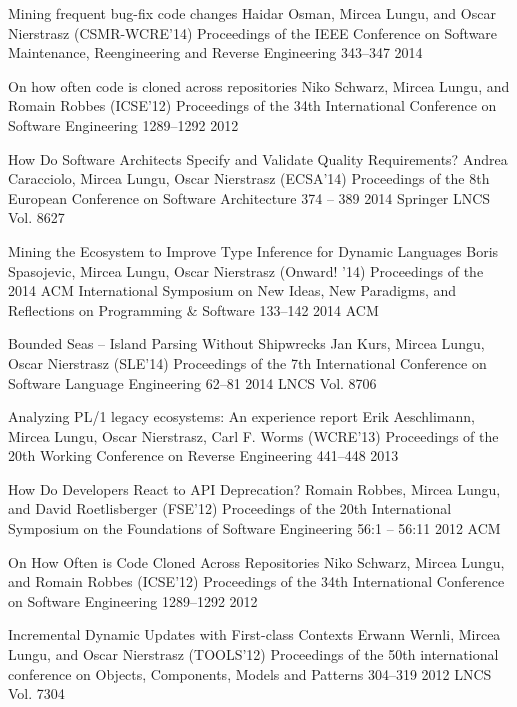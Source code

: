 \begin{enumerate}


\densepap
	{Mining frequent bug-fix code changes}
	{Haidar Osman, Mircea Lungu, and Oscar Nierstrasz}
	{(CSMR-WCRE'14) Proceedings of the IEEE Conference on Software Maintenance, Reengineering and Reverse Engineering }
	{343--347}
	{2014}
	{\IEEE}

\densepap 
	{On how often code is cloned across repositories}
	{Niko Schwarz, Mircea Lungu, and Romain Robbes}
	{(ICSE'12) Proceedings of the 34th International Conference on Software Engineering }
	{1289--1292}
	{2012}
	{\IEEE}

\densepap
	{How Do Software Architects Specify and Validate Quality Requirements?}
	{Andrea Caracciolo, Mircea Lungu, Oscar Nierstrasz}
	{(ECSA'14) Proceedings of the 8th European Conference on Software Architecture }
	{374 -- 389}
	{2014}
	{Springer LNCS Vol. 8627}

\densepap
	{Mining the Ecosystem to Improve Type Inference for Dynamic Languages}
	{Boris Spasojevic, Mircea Lungu, Oscar Nierstrasz}
	{(Onward! '14) Proceedings of the 2014 ACM International Symposium on New Ideas, New Paradigms, and Reflections on Programming \& Software }
	{133--142}
	{2014}
	{ACM}

\densepap
	{Bounded Seas -- Island Parsing Without Shipwrecks}
	{Jan Kurs, Mircea Lungu, Oscar Nierstrasz}
	{(SLE'14) Proceedings of the 7th International Conference on Software Language Engineering }
	{62--81}
	{2014}
	{LNCS Vol. 8706}

\densepap
	{Analyzing PL/1 legacy ecosystems: An experience report}
	{Erik Aeschlimann, Mircea Lungu, Oscar Nierstrasz, Carl F. Worms}
	{(WCRE'13) Proceedings of the 20th Working Conference on Reverse  Engineering }
	{441--448}
	{2013}
	{\IEEE}

\densepap
	{How Do Developers React to API Deprecation?}
	{Romain Robbes, Mircea Lungu, and David Roetlisberger}
	{(FSE'12) Proceedings of the 20th International Symposium on the Foundations of Software Engineering }
	{56:1 -- 56:11}
	{2012}
	{ACM}

\densepap
	{On How Often is Code Cloned Across Repositories}
	{Niko Schwarz, Mircea Lungu, and Romain Robbes}
	{(ICSE'12) Proceedings of the 34th International Conference on Software Engineering }
	{1289--1292}
	{2012}
	{\IEEE}

\densepap
	{Incremental Dynamic Updates with First-class Contexts}
	{Erwann Wernli, Mircea Lungu, and Oscar Nierstrasz}
	{(TOOLS'12) Proceedings of the 50th international conference on Objects, Components, Models and Patterns}
	{304--319}
	{2012}
	{LNCS Vol. 7304}



\end{enumerate}
